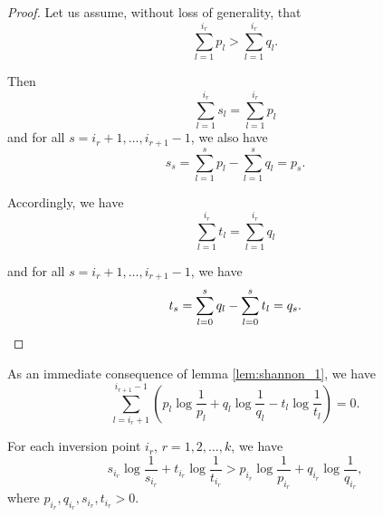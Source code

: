 \begin{proof} Let us assume, without loss of generality, that
    \begin{equation}
        \sum_{l=1}^{i_r} p_l > \sum_{l=1}^{i_r} q_l.
    \end{equation}

    Then
    \begin{equation}
        \sum_{l=1}^{i_r} s_l = \sum_{l=1}^{i_r} p_l
    \end{equation}
    and for all $s = i_r + 1, \ldots, i_{r+1} - 1$, we also have
    \begin{equation}
        s_s = \sum_{l=1}^{s} p_l - \sum_{l=1}^{s} q_l = p_s.
    \end{equation}

    Accordingly, we have
    \begin{equation}
        \sum_{l=1}^{i_r} t_l = \sum_{l=1}^{i_r} q_l
    \end{equation}

    and for all $s = i_r + 1, \ldots, i_{r+1} - 1$, we have
    \begin{equation}
        t_s = \sum_{l=0}^{s} q_l - \sum_{l=0}^{s} t_l = q_s. \qedhere
    \end{equation}
\end{proof}

As an immediate consequence of lemma \ref{lem:shannon_1}, we have
\begin{equation}
    \sum_{l=i_r+1}^{i_{r+1}-1} \left( p_l \log \frac{1}{p_l} + q_l \log \frac{1}{q_l} - t_l \log \frac{1}{t_l} \right) = 0.
\end{equation}

\begin{appendix_lemma} \label{lem:shannon_2}
    For each inversion point $i_r$, $r = 1, 2, \ldots, k$, we have
    \begin{equation}
        s_{i_r} \log \frac{1}{s_{i_r}} + t_{i_r} \log \frac{1}{t_{i_r}} > p_{i_r} \log \frac{1}{p_{i_r}} + q_{i_r} \log \frac{1}{q_{i_r}},
    \end{equation}
    where $p_{i_r}, q_{i_r}, s_{i_r}, t_{i_r} > 0$.
\end{appendix_lemma} 

